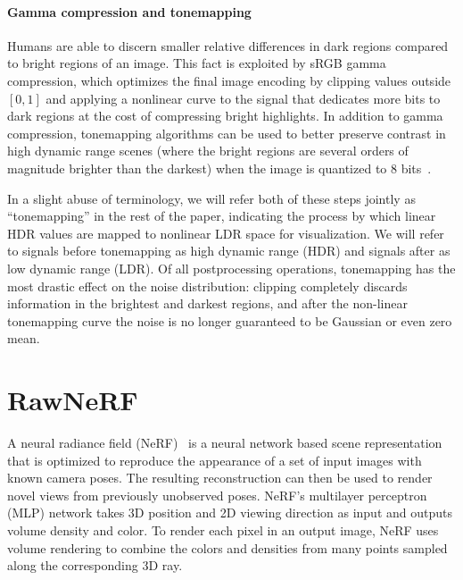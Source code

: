 \paragraph{Gamma compression and tonemapping}

Humans are able to discern smaller relative differences in dark regions compared to bright regions of an image. 
This fact is exploited by sRGB gamma compression, which optimizes the final image encoding by clipping values outside $[0,1]$ and applying a nonlinear curve to the signal that dedicates more bits to dark regions at the cost of compressing bright highlights.
In addition to gamma compression, tonemapping algorithms can be used to better preserve contrast in high dynamic range scenes (where the bright regions are several orders of magnitude brighter than the darkest) when the image is quantized to 8 bits~\cite{debevec1997,hdrplus}.

In a slight abuse of terminology, we will refer both of these steps jointly as ``tonemapping'' in the rest of the paper, indicating the process by which linear HDR values are mapped to nonlinear LDR space for visualization. We will refer to signals before tonemapping as high dynamic range (HDR) and signals after as low dynamic range (LDR).
Of all postprocessing operations, tonemapping has the most drastic effect on the noise distribution: clipping completely discards information in the brightest and darkest regions, and after the non-linear tonemapping curve the noise is no longer guaranteed to be Gaussian or even zero mean.













\section{RawNeRF}
\label{sec:method}


A neural radiance field (NeRF)~\cite{mildenhall2020nerf} is a neural network based scene representation that is optimized to reproduce the appearance of a set of input images with known camera poses. The resulting reconstruction can then be used to render novel views from previously unobserved poses. NeRF's multilayer perceptron (MLP) network takes 3D position and 2D viewing direction as input and outputs volume density and color. To render each pixel in an output image, NeRF uses volume rendering to combine the colors and densities from many points sampled along the corresponding 3D ray.

